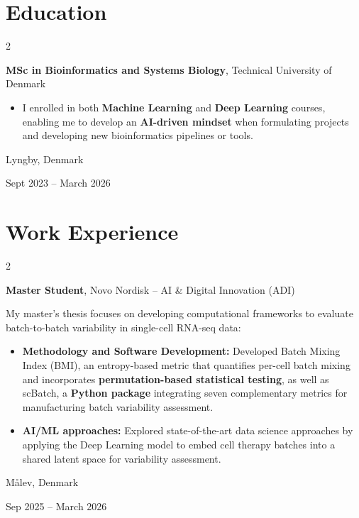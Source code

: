 \documentclass[10pt, letterpaper]{article}
\newenvironment{highlights}{
    \begin{itemize}[
        topsep=0.10 cm,
        parsep=0.10 cm,
        partopsep=0pt,
        itemsep=0pt,
        leftmargin=0.4 cm + 10pt
    ]
}{
    \end{itemize}
}
\newenvironment{twocolentry}[2][]{
    \onecolentry
    \def\secondColumn{#2}
    \setcolumnwidth{\fill, 4.5 cm}
    \begin{paracol}{2}
}{
    \switchcolumn \raggedleft \secondColumn
    \end{paracol}
    \endonecolentry
}
\begin{document}
    \section{Education}

        \begin{twocolentry}{
    Lyngby, Denmark

    Sept 2023 -- March 2026
}
    \textbf{MSc in Bioinformatics and Systems Biology}, Technical University of Denmark
    \begin{highlights}
        \item I enrolled in both \textbf{Machine Learning} and \textbf{Deep Learning} courses, enabling me to develop an \textbf{AI-driven mindset} when formulating projects and developing new bioinformatics pipelines or tools.
    \end{highlights}
\end{twocolentry}


    \section{Work Experience}

        \begin{twocolentry}{
    Målev, Denmark

    Sep 2025 -- March 2026
}
    \textbf{Master Student}, Novo Nordisk -- AI \& Digital Innovation (ADI)

    \vspace{0.1cm}

    My master's thesis focuses on developing computational frameworks to evaluate batch-to-batch variability in single-cell RNA-seq data:

    \begin{highlights}

        \item \textbf{Methodology and Software Development:} Developed Batch Mixing Index (BMI), an entropy-based metric that quantifies per-cell batch mixing and incorporates \textbf{permutation-based statistical testing}, as well as scBatch, a \textbf{Python package} integrating seven complementary metrics for manufacturing batch variability assessment.

        \vspace{0.1cm}

        \item \textbf{AI/ML approaches:} Explored state-of-the-art data science approaches by applying the Deep Learning model to embed cell therapy batches into a shared latent space for variability assessment.

    \end{highlights}
\end{twocolentry}
\end{document}

